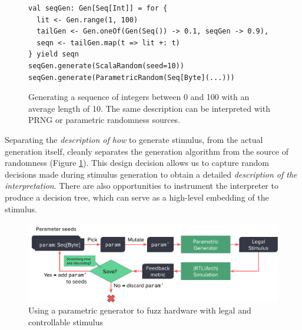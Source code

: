 \documentclass[sigplan,review,nonacm,9pt]{acmart}
\begin{document}
\begin{figure}
\begin{verbatim}
val seqGen: Gen[Seq[Int]] = for {
  lit <- Gen.range(1, 100)
  tailGen <- Gen.oneOf(Gen(Seq()) -> 0.1, seqGen -> 0.9),
  seqn <- tailGen.map(t => lit +: t)
} yield seqn
seqGen.generate(ScalaRandom(seed=10))
seqGen.generate(ParametricRandom(Seq[Byte](...)))
\end{verbatim}
\caption{Generating a sequence of integers between 0 and 100 with an average length of 10. The same description can be interpreted with PRNG or parametric randomness sources.}
\label{fig:randomapi}
\end{figure}

Separating the \textit{description of how} to generate stimulus, from the actual generation itself, cleanly separates the generation algorithm from the source of randomness (Figure \ref{fig:randomapi}).
This design decision allows us to capture random decisions made during stimulus generation to obtain a detailed \textit{description of the interpretation}.
There are also opportunities to instrument the interpreter to produce a decision tree, which can serve as a high-level embedding of the stimulus.

\begin{figure}
\includegraphics[width=\linewidth]{fuzzing/parametric_fuzzing_hw.pdf}
\caption{Using a parametric generator to fuzz hardware with legal and controllable stimulus}
\label{fig:parametric_fuzzing}
\end{figure}

%
%
\end{document}
